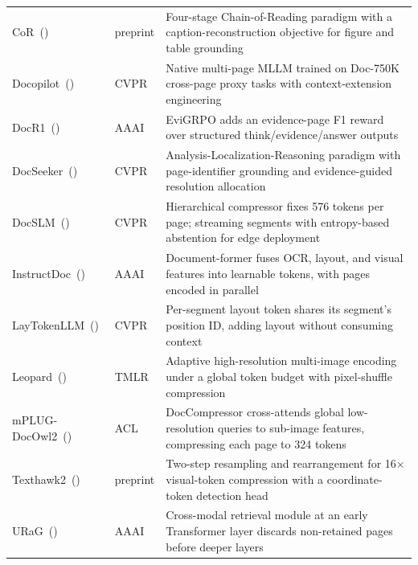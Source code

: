 \begin{table}[p]
\begin{tabularx}{\textwidth}{@{}l l >{\raggedright\arraybackslash}X@{}}
\rowcolor{sectionbg}
\multicolumn{3}{l}{\textbf{MLLM-Centric Adaptation Models}} \\
\midrule
  {CoR}~(\citeyear{guo2026end}) & preprint & Four-stage Chain-of-Reading paradigm with a caption-reconstruction objective for figure and table grounding \\
  {Docopilot}~(\citeyear{duan2025docopilot}) & CVPR & Native multi-page MLLM trained on Doc-750K cross-page proxy tasks with context-extension engineering \\
  {DocR1}~(\citeyear{xiong2026docr1}) & AAAI & EviGRPO adds an evidence-page F1 reward over structured think/evidence/answer outputs \\
  {DocSeeker}~(\citeyear{yan2025docseeker}) & CVPR & Analysis-Localization-Reasoning paradigm with page-identifier grounding and evidence-guided resolution allocation \\
  {DocSLM}~(\citeyear{hannan2025docslm}) & CVPR & Hierarchical compressor fixes 576 tokens per page; streaming segments with entropy-based abstention for edge deployment \\
  {InstructDoc}~(\citeyear{tanaka2024instructdoc}) & AAAI & Document-former fuses OCR, layout, and visual features into learnable tokens, with pages encoded in parallel \\
  {LayTokenLLM}~(\citeyear{zhu2025laytokenllm}) & CVPR & Per-segment layout token shares its segment's position ID, adding layout without consuming context \\
  {Leopard}~(\citeyear{jia2024leopard}) & TMLR & Adaptive high-resolution multi-image encoding under a global token budget with pixel-shuffle compression \\
  {mPLUG-DocOwl2}~(\citeyear{hu2025mplug2}) & ACL & DocCompressor cross-attends global low-resolution queries to sub-image features, compressing each page to 324 tokens \\
  {Texthawk2}~(\citeyear{yu2024texthawk2}) & preprint & Two-step resampling and rearrangement for 16$\times$ visual-token compression with a coordinate-token detection head \\
  {URaG}~(\citeyear{shi2026urag}) & AAAI & Cross-modal retrieval module at an early Transformer layer discards non-retained pages before deeper layers \\

\midrule[0.4pt]


\end{tabularx}
\end{table}
